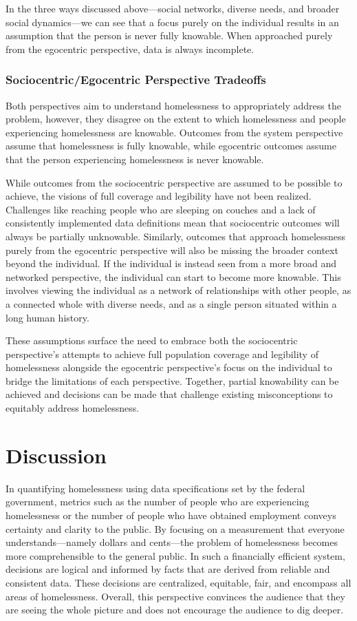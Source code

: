 In the three ways discussed above---social networks, diverse needs, and broader social dynamics---we can see that a focus purely on the individual results in an assumption that the person is never fully knowable. When approached purely from the egocentric perspective, data is always incomplete.

\subsubsection{Sociocentric/Egocentric Perspective Tradeoffs}
Both perspectives aim to understand homelessness to appropriately address the problem, however, they disagree on the extent to which homelessness and people experiencing homelessness are knowable. Outcomes from the system perspective assume that homelessness is fully knowable, while egocentric outcomes assume that the person experiencing homelessness is never knowable.

While outcomes from the sociocentric perspective are assumed to be possible to achieve, the visions of full coverage and legibility have not been realized. Challenges like reaching people who are sleeping on couches and a lack of consistently implemented data definitions mean that sociocentric outcomes will always be partially unknowable. Similarly, outcomes that approach homelessness purely from the egocentric perspective will also be missing the broader context beyond the individual. If the individual is instead seen from a more broad and networked perspective, the individual can start to become more knowable. This involves viewing the individual as a network of relationships with other people, as a connected whole with diverse needs, and as a single person situated within a long human history.

These assumptions surface the need to embrace both the sociocentric perspective's attempts to achieve full population coverage and legibility of homelessness alongside the egocentric perspective's focus on the individual to bridge the limitations of each perspective. Together, partial knowability can be achieved and decisions can be made that challenge existing misconceptions to equitably address homelessness.

\section{Discussion}

In quantifying homelessness using data specifications set by the federal government, metrics such as the number of people who are experiencing homelessness or the number of people who have obtained employment conveys certainty and clarity to the public. By focusing on a measurement that everyone understands---namely dollars and cents---the problem of homelessness becomes more comprehensible to the general public. In such a financially efficient system, decisions are logical and informed by facts that are derived from reliable and consistent data. These decisions are centralized, equitable, fair, and encompass all areas of homelessness. Overall, this perspective convinces the audience that they are seeing the whole picture and does not encourage the audience to dig deeper.

